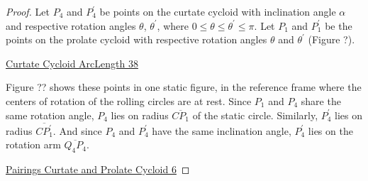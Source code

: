 \documentclass{ximera}
\begin{document}
\begin{proof}

Let $P_4$ and $P_4^\prime$ be points on the curtate cycloid with inclination angle $\alpha$ and respective rotation angles $\theta$, $\theta^\prime$, where $0\leq \theta \leq \theta^\prime \leq \pi$. Let $P_1$ and $P_1^\prime$ be the points on the prolate cycloid with respective rotation angles $\theta$ and $\theta^\prime$ (Figure ?).

\begin{onlineOnly}
    \begin{center}
\end{center}
\end{onlineOnly}

\href{https://www.desmos.com/calculator/dqd3jjjsfs}{Curtate Cycloid ArcLength 38}


Figure ?? shows these points in one static figure, in the reference frame where the centers of rotation of the rolling circles are at rest. Since $P_1$ and $P_4$ share the same rotation angle, $P_4$ lies on radius $\overline{CP_1}$ of the static circle. Similarly,   $P_4^\prime$ lies on radius $\overline{CP_1^\prime}$. And since $P_4$ and $P_4^\prime$ have the same inclination angle, $P_4^\prime$ lies on the rotation arm $\overline{Q_4P_4}$.


\begin{onlineOnly}
    \begin{center}
\end{center}
\end{onlineOnly}

\href{https://www.desmos.com/calculator/2hqmcmqihv}{Pairings Curtate and Prolate Cycloid 6}




\end{proof}
\end{document}
